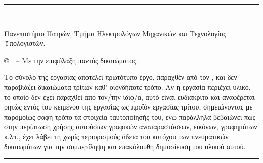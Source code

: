 \pagestyle{empty}

\vspace*{\fill}
\noindent \rule{\textwidth}{0.4pt}\\
\vspace{1em}

\noindent Πανεπιστήμιο Πατρών, Τμήμα Ηλεκτρολόγων Μηχανικών και Τεχνολογίας Υπολογιστών.

\vspace{0.5em}

\noindent {\nomme}

\vspace{0.5em}

\noindent \copyright \, \monthyear \ -- Με την επιφύλαξη παντός δικαιώματος.

\vspace{0.5em}


\noindent Το σύνολο της εργασίας αποτελεί πρωτότυπο έργο, παραχθέν από τον
{\nomme}, και δεν παραβιάζει δικαιώματα τρίτων καθ’ οιονδήποτε
τρόπο. Αν η εργασία περιέχει υλικό, το οποίο δεν έχει παραχθεί από τον/την ίδιο/α, αυτό
είναι ευδιάκριτο και αναφέρεται ρητώς εντός του κειμένου της εργασίας ως προϊόν
εργασίας τρίτου, σημειώνοντας με παρομοίως σαφή τρόπο τα στοιχεία ταυτοποίησής
του, ενώ παράλληλα βεβαιώνει πως στην περίπτωση χρήσης αυτούσιων γραφικών
αναπαραστάσεων, εικόνων, γραφημάτων κ.λπ., έχει λάβει τη χωρίς περιορισμούς άδεια
του κατόχου των πνευματικών δικαιωμάτων για την συμπερίληψη και επακόλουθη
δημοσίευση του υλικού αυτού.


\vspace{1em}
\noindent \rule{\textwidth}{0.4pt}
